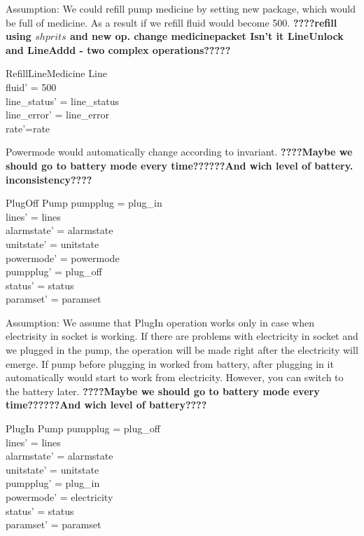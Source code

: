 \documentclass{article}
\begin{document}
Assumption: We could refill pump medicine by setting new package, which would be full of medicine. As a result if we refill fluid would become 500.
\textbf{????refill using $shprits$ and new op. change medicinepacket Isn't it LineUnlock and LineAddd - two complex operations?????}

	\begin{schema}{RefillLineMedicine}
		\Delta Line \\
	\where
	    fluid' = 500 \\
	    line\_status' = line\_status \\
		line\_error' = line\_error \\
		rate'=rate
	\end{schema}
	
	

	Powermode would automatically change according to invariant.
		\textbf{????Maybe we should go to battery mode every time??????And wich level of battery. inconsistency????}
		
	\begin{schema}{PlugOff}
		\Delta Pump		
	\where
		pumpplug = plug\_in \\		
		lines' = lines  \\
    	alarmstate' = alarmstate \\
    	unitstate' = unitstate \\
    	powermode' = powermode \\
    	pumpplug' = plug\_off \\
    	status' = status \\		
		paramset' = paramset		
	\end{schema}
	
	 Assumption: We assume that PlugIn operation works only in case when electrisity in socket is working. If there are problems with electricity in socket and we plugged in the pump, the operation will be made right after the electricity will emerge. If pump before plugging in worked from battery, after plugging in it automatically would start to work from electricity. However, you can switch to the battery later. 
		\textbf{????Maybe we should go to battery mode every time??????And wich level of battery????}
	\begin{schema}{PlugIn}
		\Delta Pump 
	\where
		pumpplug = plug\_off \\
		lines' = lines  \\
    	alarmstate' = alarmstate \\
    	unitstate' = unitstate \\
    	pumpplug' = plug\_in \\
    	powermode' = electricity \\
		status' = status \\
		paramset' = paramset		
	\end{schema}
   
\end{document}
